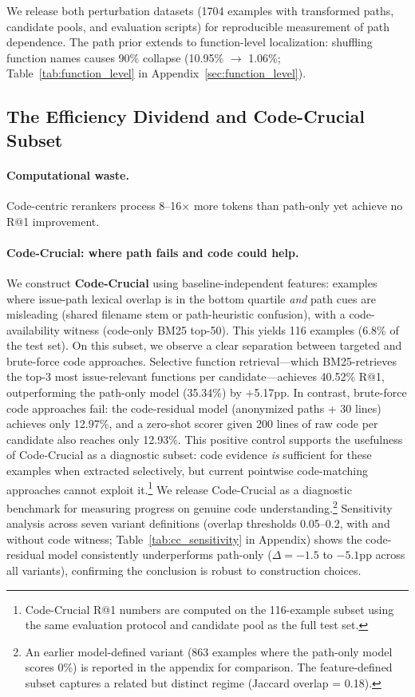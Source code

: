 \documentclass{article}
\begin{document}
We release both perturbation datasets (1704 examples with transformed paths, candidate pools, and evaluation scripts) for reproducible measurement of path dependence.
The path prior extends to function-level localization: shuffling function names causes 90\% collapse (10.95\% $\to$ 1.06\%; Table~\ref{tab:function_level} in Appendix~\ref{sec:function_level}).


\subsection{The Efficiency Dividend and Code-Crucial Subset}
\label{sec:efficiency}

\paragraph{Computational waste.}
Code-centric rerankers process 8--16$\times$ more tokens than path-only yet achieve no R@1 improvement.

\paragraph{Code-Crucial: where path fails and code could help.}
We construct \textbf{Code-Crucial} using baseline-independent features: examples where issue-path lexical overlap is in the bottom quartile \emph{and} path cues are misleading (shared filename stem or path-heuristic confusion), with a code-availability witness (code-only BM25 top-50).
This yields 116 examples (6.8\% of the test set).
On this subset, we observe a clear separation between targeted and brute-force code approaches.
Selective function retrieval---which BM25-retrieves the top-3 most issue-relevant functions per candidate---achieves 40.52\% R@1, outperforming the path-only model (35.34\%) by $+$5.17pp.
In contrast, brute-force code approaches fail: the code-residual model (anonymized paths + 30 lines) achieves only 12.97\%, and a zero-shot scorer given 200 lines of raw code per candidate also reaches only 12.93\%.
This positive control supports the usefulness of Code-Crucial as a diagnostic subset: code evidence \emph{is} sufficient for these examples when extracted selectively, but current pointwise code-matching approaches cannot exploit it.\footnote{Code-Crucial R@1 numbers are computed on the 116-example subset using the same evaluation protocol and candidate pool as the full test set.}
We release Code-Crucial as a diagnostic benchmark for measuring progress on genuine code understanding.\footnote{An earlier model-defined variant (863 examples where the path-only model scores 0\%) is reported in the appendix for comparison. The feature-defined subset captures a related but distinct regime (Jaccard overlap = 0.18).}
Sensitivity analysis across seven variant definitions (overlap thresholds 0.05--0.2, with and without code witness; Table~\ref{tab:cc_sensitivity} in Appendix) shows the code-residual model consistently underperforms path-only ($\Delta = -1.5$ to $-5.1$pp across all variants), confirming the conclusion is robust to construction choices.
\end{document}
